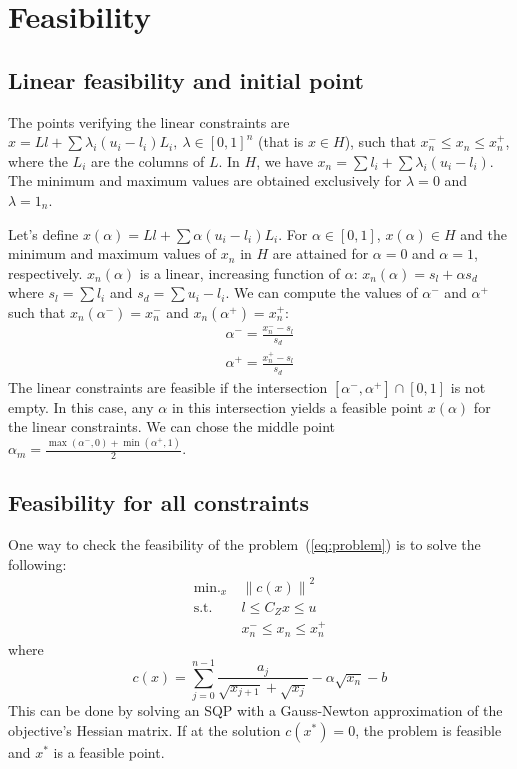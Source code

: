 \documentclass[]{article}
\DeclareMathOperator*{\minimize}{\min.}
\newcommand{\st}{\mbox{s.t.}}
\begin{document}
\section{Feasibility}
\subsection{Linear feasibility and initial point}
The points verifying the linear constraints are $x = Ll + \sum \lambda_i (u_i-l_i) L_i, \ \lambda \in \left[0,1\right]^n$ (that is $x \in H$), such that $x_n^- \leq x_n \leq x_n^+$, where the $L_i$ are the columns of $L$.\newline
In $H$, we have $x_n = \sum l_i + \sum \lambda_i (u_i-l_i)$. The minimum and maximum values are obtained exclusively for $\lambda = 0$ and $\lambda = 1_n$.

Let's define $x(\alpha) = Ll + \sum \alpha (u_i-l_i) L_i$. For $\alpha \in \left[0,1\right]$, $x(\alpha) \in H$ and the minimum and maximum values of $x_n$ in $H$ are attained for $\alpha = 0$ and $\alpha = 1$, respectively. $x_n(\alpha)$ is a linear, increasing function of $\alpha$: $x_n(\alpha) = s_l + \alpha s_d$ where $s_l = \sum l_i$ and $s_d = \sum u_i-l_i$. \newline
We can compute the values of $\alpha^-$ and $\alpha^+$ such that $x_n(\alpha^-) = x_n^-$ and $x_n(\alpha^+) = x_n^+$:
\begin{align}
 \alpha^- = \frac{x_n^- - s_l}{s_d} \\
 \alpha^+ = \frac{x_n^+ - s_l}{s_d}
\end{align}
The linear constraints are feasible if the intersection $\left[\alpha^-, \alpha^+\right] \cap \left[0,1\right]$ is not empty. In this case, any $\alpha$ in this intersection yields a feasible point $x(\alpha)$ for the linear constraints. We can chose the middle point $\alpha_m = \frac{\max(\alpha^-,0) + \min(\alpha^+,1)}{2}$.

\subsection{Feasibility for all constraints}
One way to check the feasibility of the problem~(\ref{eq:problem}) is to solve the following:
\begin{align}
  \minimize_x\ & \left\|c(x)\right\|^2 \\
  \st\ & l \leq C_Z x \leq u\\
       & x_n^- \leq x_n \leq x_n^+
\end{align}
where
\begin{equation}
  c(x) = \sum_{j=0}^{n-1} \frac{a_j}{\sqrt{x_{j+1}} + \sqrt{x_j}} - \alpha
    \sqrt{x_n} - b
\end{equation}
This can be done by solving an SQP with a Gauss-Newton approximation of the objective's Hessian matrix. If at the solution $c(x^*) = 0$, the problem is feasible and $x^*$ is a feasible point.
\end{document}
